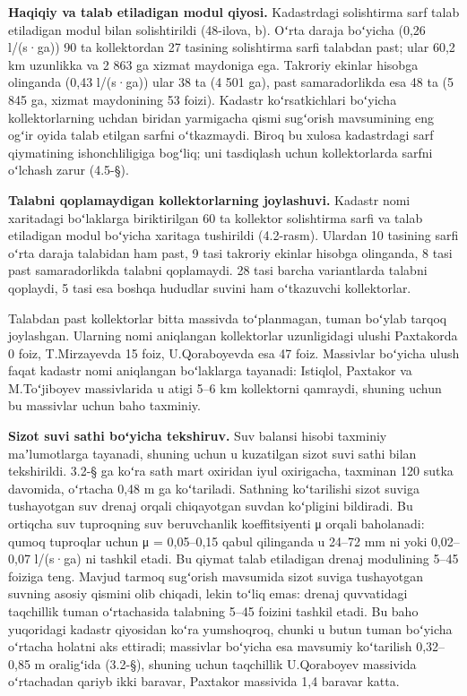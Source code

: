 \textbf{Haqiqiy va talab etiladigan modul qiyosi.} Kadastrdagi
solishtirma sarf talab etiladigan modul bilan solishtirildi (48-ilova,
b). Oʻrta daraja boʻyicha (0,26 l/(s·ga)) 90 ta kollektordan 27 tasining
solishtirma sarfi talabdan past; ular 60,2 km uzunlikka va 2 863 ga
xizmat maydoniga ega. Takroriy ekinlar hisobga olinganda (0,43 l/(s·ga))
ular 38 ta (4 501 ga), past samaradorlikda esa 48 ta (5 845 ga, xizmat
maydonining 53 foizi). Kadastr koʻrsatkichlari boʻyicha kollektorlarning
uchdan biridan yarmigacha qismi sugʻorish mavsumining eng ogʻir oyida
talab etilgan sarfni oʻtkazmaydi. Biroq bu xulosa kadastrdagi sarf
qiymatining ishonchliligiga bogʻliq; uni tasdiqlash uchun kollektorlarda
sarfni oʻlchash zarur (4.5-§).

\textbf{Talabni qoplamaydigan kollektorlarning joylashuvi.} Kadastr nomi
xaritadagi boʻlaklarga biriktirilgan 60 ta kollektor solishtirma sarfi
va talab etiladigan modul boʻyicha xaritaga tushirildi (4.2-rasm).
Ulardan 10 tasining sarfi oʻrta daraja talabidan ham past, 9 tasi
takroriy ekinlar hisobga olinganda, 8 tasi past samaradorlikda talabni
qoplamaydi. 28 tasi barcha variantlarda talabni qoplaydi, 5 tasi esa
boshqa hududlar suvini ham oʻtkazuvchi kollektorlar.

Talabdan past kollektorlar bitta massivda toʻplanmagan, tuman boʻylab
tarqoq joylashgan. Ularning nomi aniqlangan kollektorlar uzunligidagi
ulushi Paxtakorda 0 foiz, T.Mirzayevda 15 foiz, U.Qoraboyevda esa 47
foiz. Massivlar boʻyicha ulush faqat kadastr nomi aniqlangan boʻlaklarga
tayanadi: Istiqlol, Paxtakor va M.Toʻjiboyev massivlarida u atigi 5--6
km kollektorni qamraydi, shuning uchun bu massivlar uchun baho taxminiy.



\textbf{Sizot suvi sathi boʻyicha tekshiruv.} Suv balansi hisobi
taxminiy maʼlumotlarga tayanadi, shuning uchun u kuzatilgan sizot suvi
sathi bilan tekshirildi. 3.2-§ ga koʻra sath mart oxiridan iyul
oxirigacha, taxminan 120 sutka davomida, oʻrtacha 0,48 m ga koʻtariladi.
Sathning koʻtarilishi sizot suviga tushayotgan suv drenaj orqali
chiqayotgan suvdan koʻpligini bildiradi. Bu ortiqcha suv tuproqning suv
beruvchanlik koeffitsiyenti μ orqali baholanadi: qumoq tuproqlar uchun μ
= 0,05--0,15 qabul qilinganda u 24--72 mm ni yoki 0,02--0,07 l/(s·ga) ni
tashkil etadi. Bu qiymat talab etiladigan drenaj modulining 5--45
foiziga teng. Mavjud tarmoq sugʻorish mavsumida sizot suviga tushayotgan
suvning asosiy qismini olib chiqadi, lekin toʻliq emas: drenaj
quvvatidagi taqchillik tuman oʻrtachasida talabning 5--45 foizini
tashkil etadi. Bu baho yuqoridagi kadastr qiyosidan koʻra yumshoqroq,
chunki u butun tuman boʻyicha oʻrtacha holatni aks ettiradi; massivlar
boʻyicha esa mavsumiy koʻtarilish 0,32--0,85 m oraligʻida (3.2-§),
shuning uchun taqchillik U.Qoraboyev massivida oʻrtachadan qariyb ikki
baravar, Paxtakor massivida 1,4 baravar katta.

